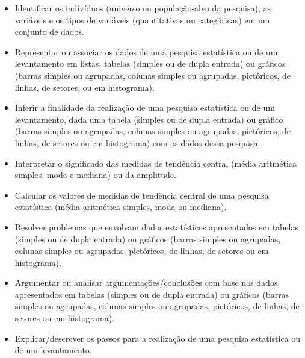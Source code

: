 \begin{itemize}
\item Identificar os indivíduos (universo ou
população-alvo da pesquisa), as variáveis e os tipos de variáveis
(quantitativas ou categóricas) em um conjunto de dados.
\item
  Representar ou associar os dados de uma pesquisa estatística ou de um
  levantamento em listas, tabelas (simples ou de dupla entrada) ou
  gráficos (barras simples ou agrupadas, colunas simples ou agrupadas,
  pictóricos, de linhas, de setores, ou em histograma).
\item
  Inferir a finalidade da realização de uma pesquisa estatística ou de
  um levantamento, dada uma tabela (simples ou de dupla entrada) ou
  gráfico (barras simples ou agrupadas, colunas simples ou agrupadas,
  pictóricos, de linhas, de setores ou em histograma) com os dados dessa
  pesquisa.
\item
  Interpretar o significado das medidas de tendência central (média
  aritmética simples, moda e mediana) ou da amplitude.
\item
  Calcular os valores de medidas de tendência central de uma pesquisa
  estatística (média aritmética simples, moda ou mediana).
\item
  Resolver problemas que envolvam dados estatísticos apresentados em
  tabelas (simples ou de dupla entrada) ou gráficos (barras simples ou
  agrupadas, colunas simples ou agrupadas, pictóricos, de linhas, de
  setores ou em histograma).
\item
  Argumentar ou analisar argumentações/conclusões com base nos dados
  apresentados em tabelas (simples ou de dupla entrada) ou gráficos
  (barras simples ou agrupadas, colunas simples ou agrupadas,
  pictóricos, de linhas, de setores ou em histograma).
\item
  Explicar/descrever os passos para a realização de uma pesquisa
  estatística ou de um levantamento.
\end{itemize}




